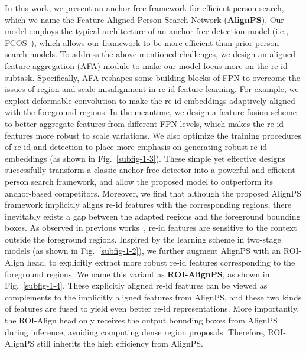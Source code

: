 \documentclass[journal]{IEEEtran}
\begin{document}
In this work, we present an anchor-free framework for efficient person search, which we name the Feature-Aligned Person Search Network (\textbf{AlignPS}). Our model employs the typical architecture of an anchor-free detection model (i.e., FCOS~\cite{DBLP:conf/iccv/TianSCH19}), which allows our framework to be more efficient than prior person search models. 
To address the above-mentioned challenges, we design an aligned feature aggregation (AFA) module to make our model focus more on the re-id subtask. Specifically, AFA reshapes some building blocks of FPN to overcome the issues of region and scale misalignment in re-id feature learning. For example, we exploit deformable convolution to make the re-id embeddings adaptively aligned with the foreground regions. In the meantime, we design a feature fusion scheme to better aggregate features from different FPN levels, which makes the re-id features more robust to scale variations. We also optimize the training procedures of re-id and detection to place more emphasis on generating robust re-id embeddings (as shown in Fig.~\ref{subfig-1-3}). These simple yet effective designs successfully transform a classic anchor-free detector into a powerful and efficient person search framework, and allow the proposed model to outperform its anchor-based competitors.
Moreover, we find that although the proposed AlignPS framework implicitly aligns re-id features with the corresponding regions, there inevitably exists a gap between the adapted regions and the foreground bounding boxes. As observed in previous works~\cite{DBLP:conf/cvpr/DongZST20a}, re-id features are sensitive to the context outside the foreground regions. Inspired by the learning scheme in two-stage models (as shown in Fig.~\ref{subfig-1-2}), we further augment AlignPS with an ROI-Align head, to explicitly extract more robust re-id features corresponding to the foreground regions. We name this variant as \textbf{ROI-AlignPS}, as shown in Fig.~\ref{subfig-1-4}. These explicitly aligned re-id features can be viewed as complements to the implicitly aligned features from AlignPS, and these two kinds of features are fused to yield even better re-id representations. More importantly, the ROI-Align head only receives the output bounding boxes from AlignPS during inference, avoiding computing dense region proposals. Therefore, ROI-AlignPS still inherits the high efficiency from AlignPS.
\end{document}
